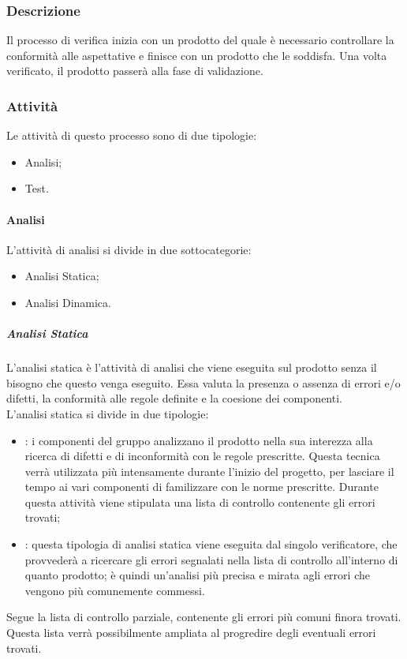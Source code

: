 \documentclass[../norme-di-progetto.tex]{subfiles}
\begin{document}
\subsubsection{Descrizione}
Il processo di verifica inizia con un prodotto del quale è necessario controllare la conformità alle aspettative e finisce con un prodotto che le soddisfa. Una volta verificato, il prodotto passerà alla fase di validazione.

\subsubsection{Attività}
Le attività di questo processo sono di due tipologie:
\begin{itemize}
  \item Analisi;
  \item Test.
\end{itemize}
\paragraph{Analisi}
L'attività di analisi si divide in due sottocategorie:
\begin{itemize}
  \item Analisi Statica;
  \item Analisi Dinamica.
\end{itemize}
\subparagraph{Analisi Statica}
L'analisi statica è l'attività di analisi che viene eseguita sul prodotto senza il bisogno che questo venga eseguito. Essa valuta la presenza o assenza di errori e/o difetti, la conformità alle regole definite e la coesione dei componenti. \\
L'analisi statica si divide in due tipologie:
\begin{itemize}
  \item \textbf{}: i componenti del gruppo analizzano il prodotto nella sua interezza alla ricerca di difetti e di inconformità con le regole prescritte. Questa tecnica verrà utilizzata più intensamente durante l'inizio del progetto, per lasciare il tempo ai vari componenti di familizzare con le norme prescritte. Durante questa attività viene stipulata una lista di controllo contenente gli errori trovati;
  \item \textbf{}: questa tipologia di analisi statica viene eseguita dal singolo verificatore, che provvederà a ricercare gli errori segnalati nella lista di controllo all'interno di quanto prodotto; è quindi un'analisi più precisa e mirata agli errori che vengono più comunemente commessi.
\end{itemize}
Segue la lista di controllo parziale, contenente gli errori più comuni finora trovati. Questa lista verrà possibilmente ampliata al progredire degli eventuali errori trovati.
\end{document}
